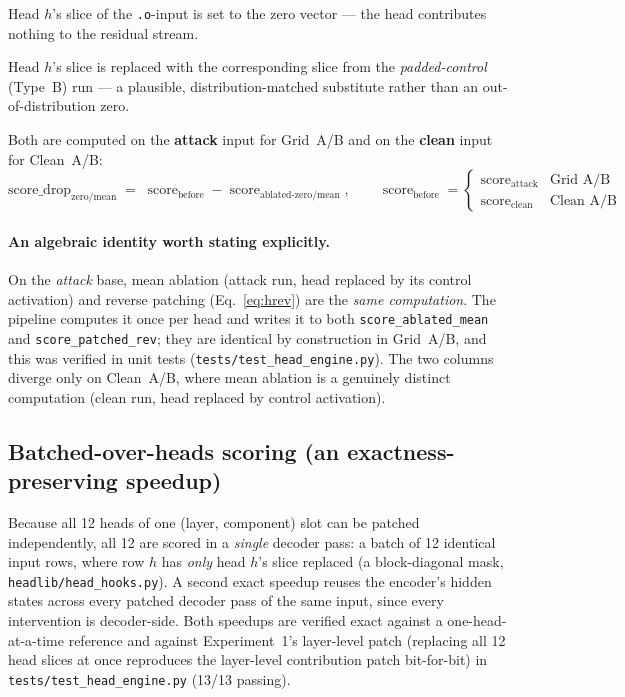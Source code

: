 \documentclass[11pt]{article}
\newcommand{\score}{\operatorname{score}}
\begin{document}
\begin{description}[leftmargin=2em,style=nextline]
  \item[Zero ablation.] Head $h$'s slice of the \texttt{.o}-input is set to
  the zero vector — the head contributes nothing to the residual stream.
  \item[Mean ablation.] Head $h$'s slice is replaced with the corresponding
  slice from the \emph{padded-control} (Type~B) run — a plausible,
  distribution-matched substitute rather than an out-of-distribution zero.
\end{description}
Both are computed on the \textbf{attack} input for Grid~A/B and on the
\textbf{clean} input for Clean~A/B:
\begin{equation}
\text{score\_drop}_{\text{zero/mean}} \;=\; \score_{\text{before}} - \score_{\text{ablated-zero/mean}},
\qquad
\score_{\text{before}} = \begin{cases}\score_{\text{attack}} & \text{Grid A/B}\\ \score_{\text{clean}} & \text{Clean A/B}\end{cases}
\label{eq:drop}
\end{equation}

\paragraph{An algebraic identity worth stating explicitly.} On the
\emph{attack} base, mean ablation (attack run, head replaced by its control
activation) and reverse patching (Eq.~\ref{eq:hrev}) are the \emph{same
computation}. The pipeline computes it once per head and writes it to both
\texttt{score\_ablated\_mean} and \texttt{score\_patched\_rev}; they are
identical by construction in Grid~A/B, and this was verified in unit tests
(\texttt{tests/test\_head\_engine.py}). The two columns diverge only on
Clean~A/B, where mean ablation is a genuinely distinct computation (clean
run, head replaced by control activation).

\subsection{Batched-over-heads scoring (an exactness-preserving speedup)}

Because all 12 heads of one (layer, component) slot can be patched
independently, all 12 are scored in a \emph{single} decoder pass: a batch of
12 identical input rows, where row $h$ has \emph{only} head $h$'s slice
replaced (a block-diagonal mask, \texttt{headlib/head\_hooks.py}). A second
exact speedup reuses the encoder's hidden states across every patched
decoder pass of the same input, since every intervention is decoder-side.
Both speedups are verified exact against a one-head-at-a-time reference and
against Experiment~1's layer-level patch (replacing all 12 head slices at
once reproduces the layer-level contribution patch bit-for-bit) in
\texttt{tests/test\_head\_engine.py} (13/13 passing).
\end{document}
